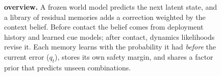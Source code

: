 \begin{figure}[t]
{}
\caption{\textbf{\method overview.} A frozen world model predicts the next latent state, and a library of residual memories adds a correction weighted by the context belief. Before contact the belief comes from deployment history and learned cue models; after contact, dynamics likelihoods revise it. Each memory learns with the probability it had \emph{before} the current error ($q_t$), stores its own safety margin, and shares a factor prior that predicts unseen combinations.}
\label{fig:method}
\end{figure}
